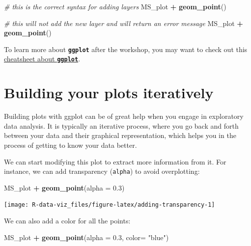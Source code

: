 \documentclass[]{book}
\newenvironment{Shaded}{\begin{snugshade}}{\end{snugshade}}
\newcommand{\KeywordTok}[1]{\textcolor[rgb]{0.13,0.29,0.53}{\textbf{#1}}}
\newcommand{\DataTypeTok}[1]{\textcolor[rgb]{0.13,0.29,0.53}{#1}}
\newcommand{\FloatTok}[1]{\textcolor[rgb]{0.00,0.00,0.81}{#1}}
\newcommand{\StringTok}[1]{\textcolor[rgb]{0.31,0.60,0.02}{#1}}
\newcommand{\CommentTok}[1]{\textcolor[rgb]{0.56,0.35,0.01}{\textit{#1}}}
\newcommand{\OperatorTok}[1]{\textcolor[rgb]{0.81,0.36,0.00}{\textbf{#1}}}
\newcommand{\NormalTok}[1]{#1}
\theoremstyle{definition}
\theoremstyle{definition}
\theoremstyle{definition}
\theoremstyle{remark}
\begin{document}
\begin{Shaded}
\begin{Highlighting}[]
\CommentTok{# this is the correct syntax for adding layers}
\NormalTok{MS_plot }\OperatorTok{+}
\StringTok{  }\KeywordTok{geom_point}\NormalTok{()}

\CommentTok{# this will not add the new layer and will return an error message}
\NormalTok{MS_plot}
  \OperatorTok{+}\StringTok{ }\KeywordTok{geom_point}\NormalTok{()}
\end{Highlighting}
\end{Shaded}

To learn more about \textbf{\texttt{ggplot}} after the workshop, you may
want to check out this
\href{https://www.rstudio.com/wp-content/uploads/2016/11/ggplot2-cheatsheet-2.1.pdf}{cheatsheet
about \textbf{\texttt{ggplot}}}.

\section{Building your plots
iteratively}\label{building-your-plots-iteratively}

Building plots with ggplot can be of great help when you engage in
exploratory data analysis. It is typically an iterative process, where
you go back and forth between your data and their graphical
representation, which helps you in the process of getting to know your
data better.

We can start modifying this plot to extract more information from it.
For instance, we can add transparency (\texttt{alpha}) to avoid
overplotting:

\begin{Shaded}
\begin{Highlighting}[]
\NormalTok{MS_plot }\OperatorTok{+}\StringTok{ }
\StringTok{  }\KeywordTok{geom_point}\NormalTok{(}\DataTypeTok{alpha =} \FloatTok{0.3}\NormalTok{)}
\end{Highlighting}
\end{Shaded}

\texttt{[image: R-data-viz\_files/figure-latex/adding-transparency-1]}

We can also add a color for all the points:

\begin{Shaded}
\begin{Highlighting}[]
\NormalTok{MS_plot }\OperatorTok{+}\StringTok{  }
\StringTok{  }\KeywordTok{geom_point}\NormalTok{(}\DataTypeTok{alpha =} \FloatTok{0.3}\NormalTok{, }\DataTypeTok{color=} \StringTok{"blue"}\NormalTok{)}
\end{Highlighting}
\end{Shaded}
\end{document}
